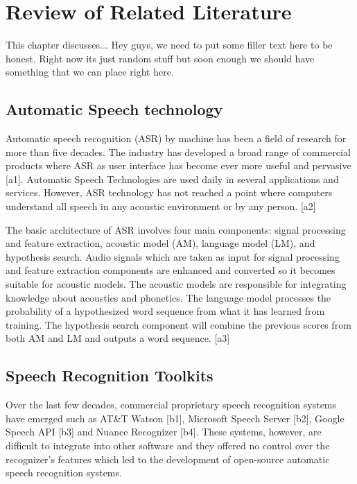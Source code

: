 
\chapter{Review of Related Literature}

This chapter discusses... Hey guys, we need to put some filler text here to be honest. Right now its just random stuff but soon enough we should have something that we can place right here.

\section{Automatic Speech technology}

Automatic speech recognition (ASR) by machine has been a field of research for more than five decades. The industry has developed a broad range of commercial products where ASR as user interface has become ever more useful and pervasive [a1]. Automatic Speech Technologies are used daily in several applications and services. However, ASR technology has not reached a point where computers understand all speech in any acoustic environment or by any person. [a2]

The basic architecture of ASR involves four main components: signal processing and feature extraction, acoustic model (AM), language model (LM), and hypothesis search. Audio signals which are taken as input for signal processing and feature extraction components are enhanced and converted so it becomes suitable for acoustic models. The acoustic models are responsible for integrating knowledge about acoustics and phonetics. The language model processes the probability of a hypothesized word sequence from what it has learned from training. The hypothesis search component will combine the previous scores from both AM and LM and outputs a word sequence. [a3]

\section{Speech Recognition Toolkits}

Over the last few decades, commercial proprietary speech recognition systems have emerged such as AT\&T Watson [b1], Microsoft Speech Server [b2], Google Speech API [b3] and Nuance Recognizer [b4]. These systems, however, are difficult to integrate into other software and they offered no control over the recognizer’s features which led to the development of open-source automatic speech recognition systems.  

